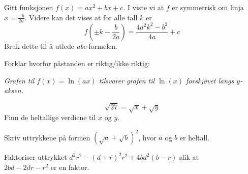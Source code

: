 Gitt funksjonen $ f(x)=ax^2+bx+c $. I  viste vi at $ f $ er symmetrisk om linja $ x=\frac{-b}{2a} $. Videre kan det vises at for alle tall $ k $ er
\[ f\left(\pm k-\frac{b}{2a}\right)=\frac{4a^2k^2-b^2}{4a}+c \]
Bruk dette til å utlede \textit{abc}-formelen.


Forklar hvorfor påstanden er riktig/ikke riktig: \os

\textsl{Grafen til $f(x)=\ln(ax)$ tilsvarer grafen til $\ln(x)$ forskjøvet langs $y$-aksen.
}


 \vs
\[ \sqrt{27}=\sqrt{x}+\sqrt{y} \]
Finn de heltallige verdiene til $ x $ og $ y $.



Skriv uttrykkene på formen $ \left(\sqrt{a}+\sqrt{b}\right)^2 $, hvor $ a $ og $ b $ er heltall.\os
{}

 \vs
{}
Faktoriser uttrykket $ d^2  r^2-(d+r)^2  r^2+4b d^2 (b-r) $ slik at\\ $ 2bd-2dr-r^2 $ er en faktor.


